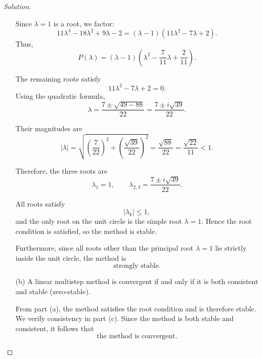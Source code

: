 \documentclass[12pt]{amsart}
\newenvironment{solution}
{\begin{proof}[Solution]}
{\end{proof}}
\begin{document}
\begin{onehalfspace}
\begin{solution}
\begin{itemize}
                Since \(\lambda=1\) is a root, we factor:
                \[
                    11\lambda^3-18\lambda^2+9\lambda-2
                    =
                    (\lambda-1)(11\lambda^2-7\lambda+2).
                \]
                Thus,
                \[
                    P(\lambda)
                    =
                    (\lambda-1)
                    \left(
                        \lambda^2-\frac{7}{11}\lambda+\frac{2}{11}
                    \right).
                \]

                The remaining roots satisfy
                \[
                    11\lambda^2-7\lambda+2=0.
                \]
                Using the quadratic formula,
                \[
                    \lambda
                    =
                    \frac{7\pm\sqrt{49-88}}{22}
                    =
                    \frac{7\pm i\sqrt{39}}{22}.
                \]

                Their magnitudes are
                \[
                    |\lambda|
                    =
                    \sqrt{
                        \left(\frac{7}{22}\right)^2
                        +
                        \left(\frac{\sqrt{39}}{22}\right)^2
                    }
                    =
                    \frac{\sqrt{88}}{22}
                    =
                    \frac{\sqrt{22}}{11}
                    <1.
                \]

                Therefore, the three roots are
                \[
                    \lambda_1=1,
                    \qquad
                    \lambda_{2,3}
                    =
                    \frac{7\pm i\sqrt{39}}{22}.
                \]

                All roots satisfy
                \[
                    |\lambda_k|\leq 1,
                \]
                and the only root on the unit circle is the simple root
                \(\lambda=1\). Hence the root condition is satisfied, so the method
                is stable.

                Furthermore, since all roots other than the principal root
                \(\lambda=1\) lie strictly inside the unit circle, the method is
                \[
                    \text{strongly stable}.
                \]

                \item[(b)] A linear multistep method is convergent if and only if it
                is both consistent and stable (zero-stable).

                From part (a), the method satisfies the root condition and is
                therefore stable. We verify consistency in part (c). Since the
                method is both stable and consistent, it follows that
                \[
                    \text{the method is convergent}.
                \]


\end{itemize}
\end{solution}
\end{onehalfspace}
\end{document}
